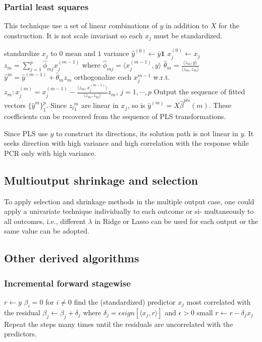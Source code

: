 \documentclass[12pt, letterpaper]{article}
\theoremstyle{definition}
\begin{document}
\subsubsection{Partial least squares}
This technique use a set of linear combinations of $y$ in addition to $X$ for the construction. It is not scale invariant so each $x_j$ must be standardized.
\begin{algorithm}
standardize $x_j$ to $0$ mean and $1$ variance\;
$\hat{y}^{(0)}\leftarrow \bar{y}\mathbf{1}$\;
$x_j^{(0)} \leftarrow x_j$ \;
{
    $z_m  = \sum_{j=1}^p \hat{\phi}_{mj} x_j^{(m-1)}$ where $\hat{\phi}_{mj} = \langle x_j^{(m-1)}, y\rangle$ \; 
    $\hat{\theta}_m = \frac{\langle z_m, y\rangle}{\langle z_m, z_m\rangle} $\;
    $\hat{y}^m = \hat{y}^{(m-1)} + \hat{\theta}_m z_m$\;
    orthogonalize each $x_j^{m-1}$ w.r.t. $z_m: x_j^{(m)} = x_j^{(m-1)} - \frac{\langle z_m, x_j^{(m-1)}\rangle}{\langle z_m, z_m\rangle} z_m$, $j=1,\cdots, p$\;
}
Output the sequence of fitted vectors $\{\hat{y}^m\}_1^p$. Since ${z_l}_1^m$ are linear in $x_j$, so is $\hat{y}^{(m)} = X \hat{\beta}^{pls}(m)$. These coefficients can be recovered from the sequence of PLS transformations.
\end{algorithm}

Since PLS use $y$ to construct its directions, its solution path is not linear in $y$. It seeks direction with high variance and high correlation with the response while PCR only with high variance.

\subsection{Multioutput shrinkage and selection}
To apply selection and shrinkage methods in the multiple output case, one could apply a univariate technique individually to each outcome or si- multaneously to all outcomes, i.e., different $\lambda$ in Ridge or Lasso can be used for each output or the same value can be adopted.

\subsection{Other derived algorithms}
\subsubsection{Incremental forward stagewise}
\begin{algorithm}
$r\leftarrow y$ \;
$\beta_i =0$ for $i\ne 0$\;
find the (standardized) predictor $x_j$ most correlated with the residual \;
$\beta_j \leftarrow \beta_j + \delta_j$ where $\delta_j = \epsilon sign\left[\langle x_j, r \rangle\right]$ and $\epsilon >0$ small\;
$r\leftarrow r-\delta_j x_j$\;
Repeat the steps many times until the residuals are uncorrelated with the predictors.
\end{algorithm}
\end{document}
